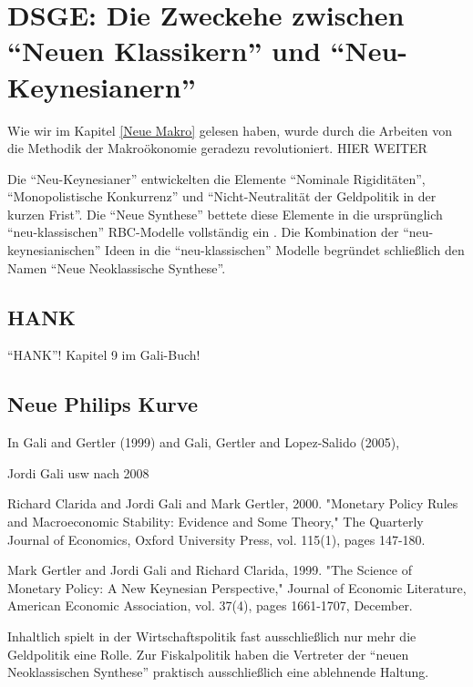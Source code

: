 \section{DSGE: Die Zweckehe zwischen "`Neuen Klassikern"' und "`Neu-Keynesianern"'}

Wie wir im Kapitel \ref{Neue Makro} gelesen haben, wurde durch die Arbeiten von \textcite{Kydland1982, Plosser1983} die Methodik der Makroökonomie geradezu revolutioniert. 
HIER WEITER


Die "`Neu-Keynesianer"' entwickelten die Elemente "`Nominale Rigiditäten"', "`Monopolistische Konkurrenz"' und "`Nicht-Neutralität der Geldpolitik in der kurzen Frist"'. Die "`Neue Synthese"'  bettete diese Elemente in die ursprünglich "`neu-klassischen"' RBC-Modelle vollständig ein \parencite[S. 6]{Gali2015}. Die Kombination der "`neu-keynesianischen"' Ideen in die "`neu-klassischen"' Modelle begründet schließlich den Namen "`Neue Neoklassische Synthese"'. 


\subsection{HANK}
"`HANK"'!
Kapitel 9 im Gali-Buch!

\subsection{Neue Philips Kurve}

In Gali and Gertler (1999) and Gali, Gertler and Lopez-Salido (2005),


Jordi Gali usw nach 2008




Richard Clarida and Jordi Gali and Mark Gertler, 2000. "Monetary Policy Rules and Macroeconomic Stability: Evidence and Some Theory," The Quarterly Journal of Economics, Oxford University Press, vol. 115(1), pages 147-180.

Mark Gertler and Jordi Gali and Richard Clarida, 1999. "The Science of Monetary Policy: A New Keynesian Perspective," Journal of Economic Literature, American Economic Association, vol. 37(4), pages 1661-1707, December.



Inhaltlich spielt in der Wirtschaftspolitik fast ausschließlich nur mehr die Geldpolitik eine Rolle. Zur Fiskalpolitik haben die Vertreter der "`neuen Neoklassischen Synthese"' praktisch ausschließlich eine ablehnende Haltung.







